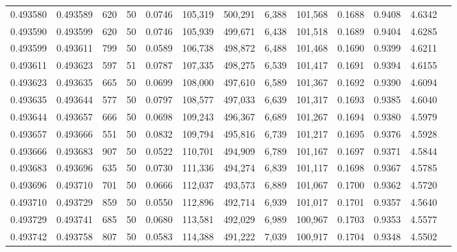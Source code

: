 \begin{tabular}{rrrrrrrrrrrrr}
0.493580 & 0.493589 &   620 &  50 &                                     0.0746 & 105,319 & 500,291 &   6,388 & 101,568 & 0.1688 & 0.9408 & 4.6342 \\
0.493590 & 0.493599 &   620 &  50 &                                     0.0746 & 105,939 & 499,671 &   6,438 & 101,518 & 0.1689 & 0.9404 & 4.6285 \\
0.493599 & 0.493611 &   799 &  50 &                                     0.0589 & 106,738 & 498,872 &   6,488 & 101,468 & 0.1690 & 0.9399 & 4.6211 \\
0.493611 & 0.493623 &   597 &  51 &                                     0.0787 & 107,335 & 498,275 &   6,539 & 101,417 & 0.1691 & 0.9394 & 4.6155 \\
0.493623 & 0.493635 &   665 &  50 &                                     0.0699 & 108,000 & 497,610 &   6,589 & 101,367 & 0.1692 & 0.9390 & 4.6094 \\
0.493635 & 0.493644 &   577 &  50 &                                     0.0797 & 108,577 & 497,033 &   6,639 & 101,317 & 0.1693 & 0.9385 & 4.6040 \\
0.493644 & 0.493657 &   666 &  50 &                                     0.0698 & 109,243 & 496,367 &   6,689 & 101,267 & 0.1694 & 0.9380 & 4.5979 \\
0.493657 & 0.493666 &   551 &  50 &                                     0.0832 & 109,794 & 495,816 &   6,739 & 101,217 & 0.1695 & 0.9376 & 4.5928 \\
0.493666 & 0.493683 &   907 &  50 &                                     0.0522 & 110,701 & 494,909 &   6,789 & 101,167 & 0.1697 & 0.9371 & 4.5844 \\
0.493683 & 0.493696 &   635 &  50 &                                     0.0730 & 111,336 & 494,274 &   6,839 & 101,117 & 0.1698 & 0.9367 & 4.5785 \\
0.493696 & 0.493710 &   701 &  50 &                                     0.0666 & 112,037 & 493,573 &   6,889 & 101,067 & 0.1700 & 0.9362 & 4.5720 \\
0.493710 & 0.493729 &   859 &  50 &                                     0.0550 & 112,896 & 492,714 &   6,939 & 101,017 & 0.1701 & 0.9357 & 4.5640 \\
0.493729 & 0.493741 &   685 &  50 &                                     0.0680 & 113,581 & 492,029 &   6,989 & 100,967 & 0.1703 & 0.9353 & 4.5577 \\
0.493742 & 0.493758 &   807 &  50 &                                     0.0583 & 114,388 & 491,222 &   7,039 & 100,917 & 0.1704 & 0.9348 & 4.5502 \\

\end{tabular}
